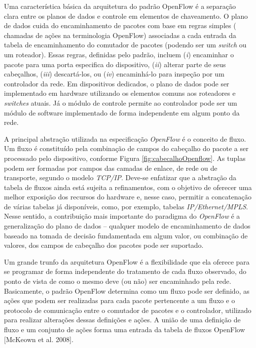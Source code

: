Uma característica básica da arquitetura do padrão OpenFlow 
é a separação clara entre os planos de dados e controle em
elementos de chaveamento. O plano de dados cuida do 
encaminhamento de pacotes com base em regras simples (
chamadas de ações na terminologia OpenFlow) associadas
a cada entrada da tabela de encaminhamento do comutador 
de pacotes (podendo ser um \textit{switch} ou um roteador).
Essas regras, definidas pelo padrão, incluem (\textit{i}) 
encaminhar o pacote para uma porta especifica do dispositivo,
(\textit{ii}) alterar parte de seus cabeçalhos, (\textit{iii}) 
descartá-los, ou (\textit{iv}) encaminhá-lo para inspeção 
por um controlador da rede. Em dispositivos dedicados, o plano
de dados pode ser implementado em hardware utilizando os
elementos comuns aos roteadores e \textit{switches} atuais.
Já o módulo de controle permite ao controlador pode ser um 
módulo de software implementado de forma independente em
algum ponto da rede.

A principal abstração utilizada na especificação
\textit{OpenFlow} é o conceito
de fluxo. Um fluxo é constituído pela combinação de campos
do cabeçalho do pacote a ser processado pelo dispositivo,
conforme Figura \ref{fig:cabecalhoOpenflow}. As tuplas podem
ser formadas por campos das camadas de enlace, de rede ou de
transporte, segundo o modelo \textit{TCP/IP}. Deve-se
enfatizar que a abstração da tabela de fluxos ainda está sujeita a
refinamentos, com o objetivo de oferecer uma melhor
exposição dos recursos do hardware e, nesse caso, permitir a
concatenação de várias tabelas já disponíveis, como, por
exemplo, tabelas \textit{IP/Ethernet/MPLS}. Nesse sentido, a
contribuição mais importante do paradigma do
\textit{OpenFlow} é a generalização do plano
de dados – qualquer modelo de encaminhamento de dados
baseado na tomada de decisão fundamentada em algum valor, ou
combinação de valores, dos campos de cabeçalho dos pacotes
pode ser suportado.

Um grande trunfo da arquitetura OpenFlow é a flexibilidade 
que ela oferece para se programar de forma independente do
tratamento de cada fluxo observado, do ponto de vista de como
o mesmo deve (ou não) ser encaminhado pela rede. Basicamente,
o padrão OpenFlow determina como um fluxo pode ser definido,
as ações que podem ser realizadas para cada pacote pertencente
a um fluxo e o protocolo de comunicação entre o comutador de 
pacotes e o controlador, utilizado para realizar alterações dessas 
definições e ações. A união de uma definição de fluxo e um
conjunto de ações forma uma entrada da tabela de fluxos 
OpenFlow [McKeown et al. 2008].

